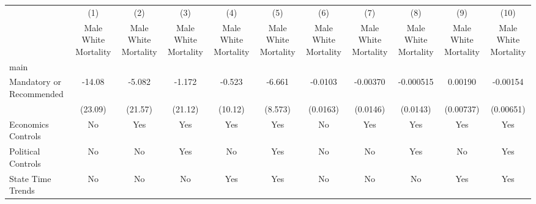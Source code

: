 {
\def\sym#1{\ifmmode^{#1}\else\(^{#1}\)\fi}
\begin{longtable}{l*{10}{c}}
\hline\hline\endfirsthead\hline\endhead\hline\endfoot\endlastfoot
                    &\multicolumn{1}{c}{(1)}&\multicolumn{1}{c}{(2)}&\multicolumn{1}{c}{(3)}&\multicolumn{1}{c}{(4)}&\multicolumn{1}{c}{(5)}&\multicolumn{1}{c}{(6)}&\multicolumn{1}{c}{(7)}&\multicolumn{1}{c}{(8)}&\multicolumn{1}{c}{(9)}&\multicolumn{1}{c}{(10)}\\
                    &\multicolumn{1}{c}{Male White Mortality}&\multicolumn{1}{c}{Male White Mortality}&\multicolumn{1}{c}{Male White Mortality}&\multicolumn{1}{c}{Male White Mortality}&\multicolumn{1}{c}{Male White Mortality}&\multicolumn{1}{c}{Male White Mortality}&\multicolumn{1}{c}{Male White Mortality}&\multicolumn{1}{c}{Male White Mortality}&\multicolumn{1}{c}{Male White Mortality}&\multicolumn{1}{c}{Male White Mortality}\\
\hline
main                &                     &                     &                     &                     &                     &                     &                     &                     &                     &                     \\
Mandatory or Recommended&      -14.08         &      -5.082         &      -1.172         &      -0.523         &      -6.661         &     -0.0103         &    -0.00370         &   -0.000515         &     0.00190         &    -0.00154         \\
                    &     (23.09)         &     (21.57)         &     (21.12)         &     (10.12)         &     (8.573)         &    (0.0163)         &    (0.0146)         &    (0.0143)         &   (0.00737)         &   (0.00651)         \\
[1em]
Economics Controls  &          No         &         Yes         &         Yes         &         Yes         &         Yes         &          No         &         Yes         &         Yes         &         Yes         &         Yes         \\
[1em]
Political Controls  &          No         &          No         &         Yes         &          No         &         Yes         &          No         &          No         &         Yes         &          No         &         Yes         \\
[1em]
State Time Trends   &          No         &          No         &          No         &         Yes         &         Yes         &          No         &          No         &          No         &         Yes         &         Yes         \\

\end{longtable}}
